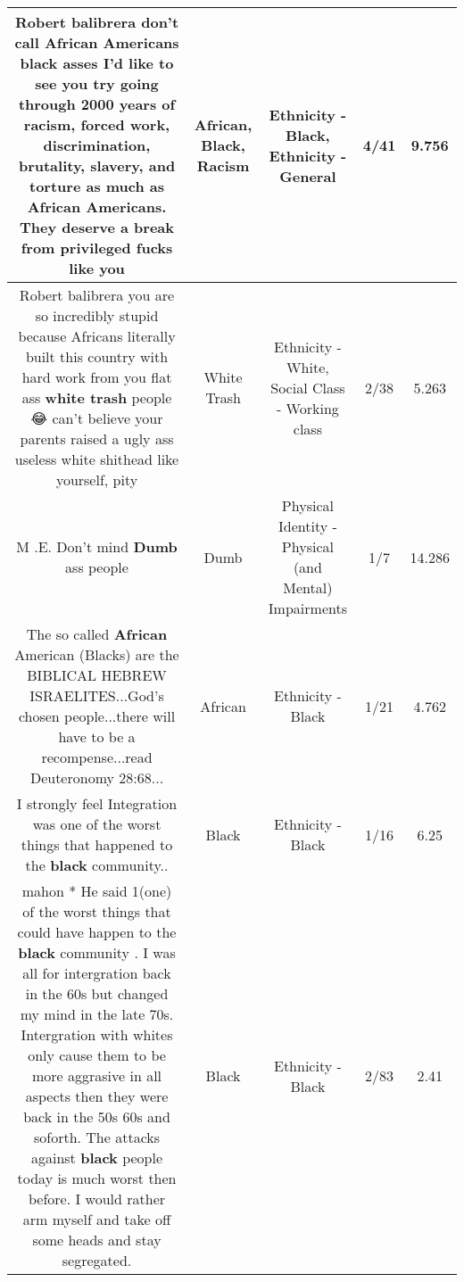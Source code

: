 \documentclass[11pt]{article}
\newlength\mylength
\begin{document}
\begin{center}
\begin{longtable}{|C{.65\mylength}|C{.30\mylength}|C{.12\mylength}|C{.12\mylength}|C{.12\mylength}|}
  \small Robert balibrera don't call \textbf{African} Americans \textbf{black} asses I'd like to see you try going through 2000 years of \textbf{racism}, forced work, discrimination, brutality, slavery, and torture as much as \textbf{African} Americans. They deserve a break from privileged fucks like you\normalsize   & African, Black, Racism & Ethnicity - Black, Ethnicity - General & 4/41 & 9.756 \\  \hline
  \small Robert balibrera you are so incredibly stupid because Africans literally built this country with hard work from you flat ass \textbf{w\textbf{hite trash}} people 😂 can't believe your parents raised a ugly ass useless white shithead like yourself, pity\normalsize   & White Trash & Ethnicity - White, Social Class - Working class & 2/38 & 5.263 \\  \hline
  \small M .E. Don't mind \textbf{Dumb} ass people\normalsize   & Dumb & Physical Identity - Physical (and Mental) Impairments & 1/7 & 14.286 \\  \hline
  \small The so called \textbf{African} American (Blacks) are the BIBLICAL HEBREW ISRAELITES...God's chosen people...there will have to be a recompense...read Deuteronomy 28:68...\normalsize   & African & Ethnicity - Black & 1/21 & 4.762 \\  \hline
  \small I strongly feel Integration was one of the worst things that happened to the \textbf{black} community..\normalsize   & Black & Ethnicity - Black & 1/16 & 6.25 \\  \hline
  \small {} mahon * He said 1(one) of the worst things that could have  happen to the \textbf{black} community . I was all for intergration back in the 60s but changed my mind in the late 70s. Intergration with whites only cause them to be more aggrasive in all aspects then they were back in the 50s 60s and soforth. The attacks against \textbf{black} people today is much worst then before. I would rather arm myself and take off some heads and stay segregated.\normalsize   & Black & Ethnicity - Black & 2/83 & 2.41 \\  \hline

\end{longtable}
\end{center}
\end{document}
